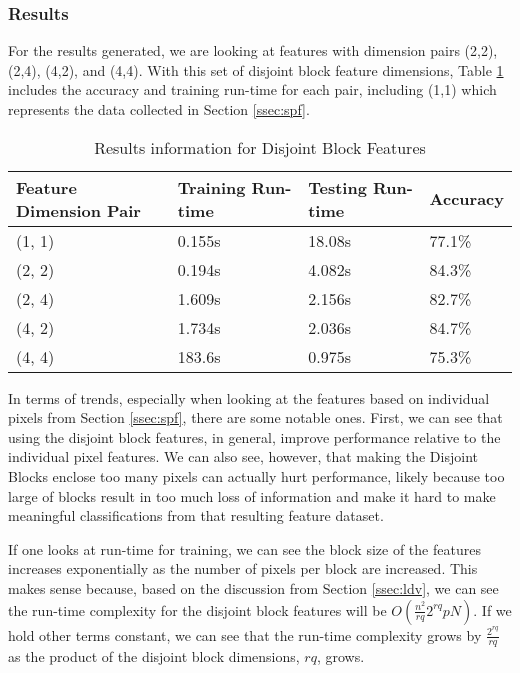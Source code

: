 \documentclass{article}[12pt]
\begin{document}
  \subsubsection{Results} \label{sssec:disres}
  For the results generated, we are looking at features with dimension pairs (2,2), (2,4), (4,2), and (4,4). With this set of disjoint block feature dimensions, Table \ref{tab:dis} includes the accuracy and training run-time for each pair, including (1,1) which represents the data collected in Section \ref{ssec:spf}.
  
  \begin{table}[ht]
  	\centering
  	\begin{tabular}{l | l | l | l}
  		\hline
  		Feature Dimension Pair & Training Run-time & Testing Run-time & Accuracy  \\
  		\hline \hline 
  		(1, 1) & 0.155s & 18.08s &77.1\% \\
  		(2, 2) & 0.194s & 4.082s &84.3\% \\
  		(2, 4) & 1.609s & 2.156s &82.7\% \\
  		(4, 2) & 1.734s & 2.036s &84.7\% \\
  		(4, 4) & 183.6s & 0.975s &75.3\% \\
  		\hline
  	\end{tabular}
  \caption{Results information for Disjoint Block Features} \label{tab:dis}
  \end{table}
  
  In terms of trends, especially when looking at the features based on individual pixels from Section \ref{ssec:spf}, there are some notable ones. First, we can see that using the disjoint block features, in general, improve performance relative to the individual pixel features. We can also see, however, that making the Disjoint Blocks enclose too many pixels can actually hurt performance, likely because too large of blocks result in too much loss of information and make it hard to make meaningful classifications from that resulting feature dataset. 
  
  If one looks at run-time for training, we can see the block size of the features increases exponentially as the number of pixels per block are increased. This makes sense because, based on the discussion from Section \ref{ssec:ldv}, we can see the run-time complexity for the disjoint block features will be $O\left(\frac{n^2}{rq} 2^{rq} p N\right)$. If we hold other terms constant, we can see that the run-time complexity grows by $\frac{2^{rq}}{rq}$ as the product of the disjoint block dimensions, $rq$, grows. 
  
\end{document}

